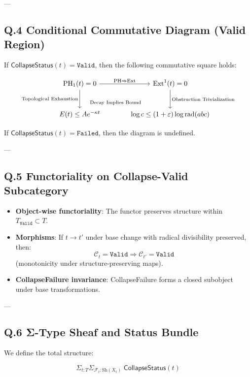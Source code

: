 \documentclass[11pt]{article}
\DeclareMathOperator{\Ext}{Ext}
\DeclareMathOperator{\PH}{PH}
\begin{document}
---

\subsection*{Q.4 Conditional Commutative Diagram (Valid Region)}

If \( \mathsf{CollapseStatus}(t) = \texttt{Valid} \), then the following commutative square holds:

\[
\begin{tikzcd}[row sep=large, column sep=large]
\PH_1(t) = 0
  \arrow[r, "\text{PH} \Rightarrow \Ext"]
  \arrow[d, swap, "\text{Topological Exhaustion}"]
& \Ext^1(t) = 0
  \arrow[d, "\text{Obstruction Trivialization}"] \\
E(t) \leq Ae^{-\kappa t}
  \arrow[r, "\text{Decay Implies Bound}" description, yshift=4.0ex]
& \log c \leq (1+\varepsilon)\log \mathrm{rad}(abc)
\end{tikzcd}
\]


If \( \mathsf{CollapseStatus}(t) = \texttt{Failed} \), then the diagram is undefined.

---

\subsection*{Q.5 Functoriality on Collapse-Valid Subcategory}

\begin{itemize}
  \item \textbf{Object-wise functoriality}: The functor preserves structure within \( T_{\texttt{Valid}} \subset T \).
  \item \textbf{Morphisms}: If \( t \to t' \) under base change with radical divisibility preserved,  
  then:
  \[
  \mathcal{C}_{t} = \texttt{Valid} \Rightarrow \mathcal{C}_{t'} = \texttt{Valid}
  \]
  (monotonicity under structure-preserving maps).
  \item \textbf{CollapseFailure invariance}: CollapseFailure forms a closed subobject under base transformations.
\end{itemize}

---

\subsection*{Q.6 Σ-Type Sheaf and Status Bundle}

We define the total structure:

\[
\Sigma_{t:T} \Sigma_{\mathcal{F}_t:\mathrm{Sh}(X_t)} \;
  \mathsf{CollapseStatus}(t)
\]
\end{document}
